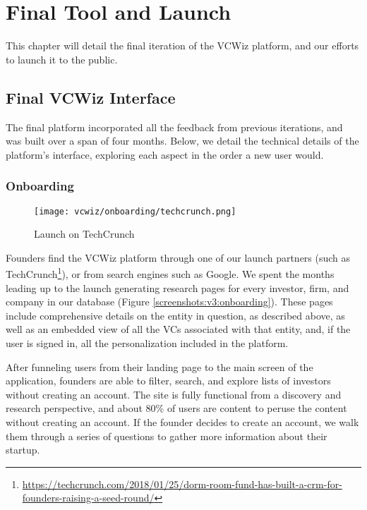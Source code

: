 \chapter{Final Tool and Launch}

This chapter will detail the final iteration of the VCWiz platform, and our efforts to launch it to the public.

\section{Final VCWiz Interface}

The final platform incorporated all the feedback from previous iterations, and was built over a span of four months. Below, we detail the technical details of the platform's interface, exploring each aspect in the order a new user would.

\subsection{Onboarding}

\begin{figure}[ht]
  \centering
  \texttt{[image: vcwiz/onboarding/techcrunch.png]}
  \caption*{Launch on TechCrunch}
\end{figure}

Founders find the VCWiz platform through one of our launch partners (such as TechCrunch\footnote{\url{https://techcrunch.com/2018/01/25/dorm-room-fund-has-built-a-crm-for-founders-raising-a-seed-round/}}), or from search engines such as Google. We spent the months leading up to the launch generating research pages for every investor, firm, and company in our database (Figure \ref{screenshots:v3:onboarding}). These pages include comprehensive details on the entity in question, as described above, as well as an embedded view of all the VCs associated with that entity, and, if the user is signed in, all the personalization included in the platform.

After funneling users from their landing page to the main screen of the application, founders are able to filter, search, and explore lists of investors without creating an account. The site is fully functional from a discovery and research perspective, and about 80\% of users are content to peruse the content without creating an account. If the founder decides to create an account, we walk them through a series of questions to gather more information about their startup.

